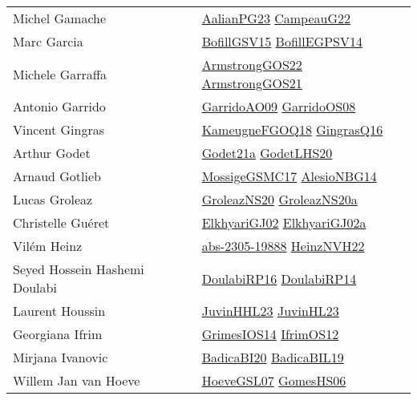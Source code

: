 {\begin{longtable}{p{4cm}p{20cm}}
Michel Gamache & \href{papers/AalianPG23.pdf}{AalianPG23}\cite{AalianPG23} \href{articles/CampeauG22.pdf}{CampeauG22}\cite{CampeauG22} \\
Marc Garcia & \href{papers/BofillGSV15.pdf}{BofillGSV15}\cite{BofillGSV15} \href{papers/BofillEGPSV14.pdf}{BofillEGPSV14}\cite{BofillEGPSV14} \\
Michele Garraffa & \href{papers/ArmstrongGOS22.pdf}{ArmstrongGOS22}\cite{ArmstrongGOS22} \href{papers/ArmstrongGOS21.pdf}{ArmstrongGOS21}\cite{ArmstrongGOS21} \\
Antonio Garrido & \href{articles/GarridoAO09.pdf}{GarridoAO09}\cite{GarridoAO09} \href{articles/GarridoOS08.pdf}{GarridoOS08}\cite{GarridoOS08} \\
Vincent Gingras & \href{papers/KameugneFGOQ18.pdf}{KameugneFGOQ18}\cite{KameugneFGOQ18} \href{papers/GingrasQ16.pdf}{GingrasQ16}\cite{GingrasQ16} \\
Arthur Godet & \href{}{Godet21a}\cite{Godet21a} \href{papers/GodetLHS20.pdf}{GodetLHS20}\cite{GodetLHS20} \\
Arnaud Gotlieb & \href{papers/MossigeGSMC17.pdf}{MossigeGSMC17}\cite{MossigeGSMC17} \href{papers/AlesioNBG14.pdf}{AlesioNBG14}\cite{AlesioNBG14} \\
Lucas Groleaz & \href{papers/GroleazNS20.pdf}{GroleazNS20}\cite{GroleazNS20} \href{papers/GroleazNS20a.pdf}{GroleazNS20a}\cite{GroleazNS20a} \\
Christelle Gu{\'{e}}ret & \href{papers/ElkhyariGJ02.pdf}{ElkhyariGJ02}\cite{ElkhyariGJ02} \href{papers/ElkhyariGJ02a.pdf}{ElkhyariGJ02a}\cite{ElkhyariGJ02a} \\
Vil{\'{e}}m Heinz & \href{articles/abs-2305-19888.pdf}{abs-2305-19888}\cite{abs-2305-19888} \href{articles/HeinzNVH22.pdf}{HeinzNVH22}\cite{HeinzNVH22} \\
Seyed Hossein Hashemi Doulabi & \href{articles/DoulabiRP16.pdf}{DoulabiRP16}\cite{DoulabiRP16} \href{papers/DoulabiRP14.pdf}{DoulabiRP14}\cite{DoulabiRP14} \\
Laurent Houssin & \href{papers/JuvinHHL23.pdf}{JuvinHHL23}\cite{JuvinHHL23} \href{papers/JuvinHL23.pdf}{JuvinHL23}\cite{JuvinHL23} \\
Georgiana Ifrim & \href{articles/GrimesIOS14.pdf}{GrimesIOS14}\cite{GrimesIOS14} \href{papers/IfrimOS12.pdf}{IfrimOS12}\cite{IfrimOS12} \\
Mirjana Ivanovic & \href{articles/BadicaBI20.pdf}{BadicaBI20}\cite{BadicaBI20} \href{papers/BadicaBIL19.pdf}{BadicaBIL19}\cite{BadicaBIL19} \\
Willem Jan van Hoeve & \href{papers/HoeveGSL07.pdf}{HoeveGSL07}\cite{HoeveGSL07} \href{papers/GomesHS06.pdf}{GomesHS06}\cite{GomesHS06} \\

\end{longtable}}
